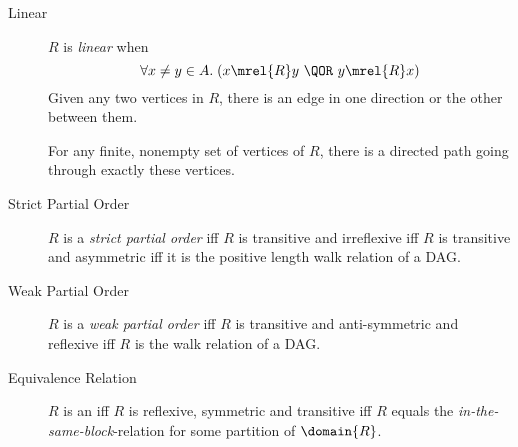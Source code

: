 \begin{description}
\iffalse
For any walk $v_0, v_1, \dots, v_k$ in~$G$ where $k \ge 2$,
$\diredge{v_0}{v_k}$ is in~$G$ (and, hence, $\diredge{v_i}{v_j}$ is
also in~$G$ for all $i < j$.
\fi

\item[Linear] $R$ is \emph{linear}%
when
\[
 \forall x \neq y \in A. \; (x \mrel{R} y\ \QOR\ y \mrel{R} x)
\]
Given any two vertices in $R$, there is an edge in one direction or the
other between them.

For any finite, nonempty set of vertices of $R$, there is a directed path
going through exactly these vertices.

\item[Strict Partial Order] $R$ is a \emph{strict partial order}%
iff $R$ is transitive and irreflexive iff $R$ is transitive and
  asymmetric iff it is the positive length walk relation of a DAG.
  
\item[Weak Partial Order] $R$ is a \emph{weak partial order}%
iff $R$ is transitive and anti-symmetric and reflexive iff $R$ is the walk
  relation of a DAG.

\item[Equivalence Relation] $R$ is an \emph{} iff $R$
  is reflexive, symmetric and transitive iff $R$ equals the
  \emph{in-the-same-block}-relation for some partition of $\domain{R}$.

\end{description}

\endinput

